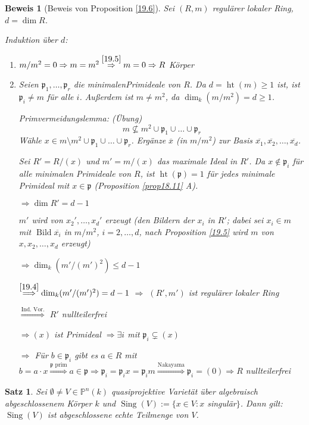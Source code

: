 \documentclass[a4paper, 12pt, numbers=noendperiod, chapterprefix=true]{scrbook}
\theoremstyle{break}
\newtheorem{Satz}{Satz}
\theoremstyle{nonumberbreak}
\newtheorem{Bew}{Beweis}
\theoremstyle{nonumberplain}
\DeclareMathOperator{\Sing}{Sing}
\DeclareMathOperator{\Bild}{Bild}
\DeclareMathOperator{\Ht}{ht}
\newcommand{\IP}{\mathbb{P}}%
\newcommand{\frakp}{\mathfrak{p}}
\begin{document}
\begin{Bew}[Beweis von Proposition \ref{19.6}]
Sei $(R,m)$ regul\"arer lokaler Ring, $d=\dim R$.

\emph{Induktion \"uber $d$:}\begin{enumerate}[\underline{$d=0$}:]
\item[\underline{$d=0$}:]
	$m/m^2=0\Rightarrow m=m^2 \overset{\ref{19.5}}{\Rightarrow} m=0 \Rightarrow R$ K\"orper
\item[\underline{$d\ge1$}:]
	Seien $\frakp_1,\ldots ,\frakp_r$ die minimalenPrimideale von $R$. Da $d=\Ht(m)\ge1$ ist, ist $\frakp_i\ne m$ f\"ur alle $i$. Au\ss erdem ist $m\ne m^2$, da $\dim_k(m/m^2)=d\ge1$.
	
	\emph{Primvermeidungslemma:} (\"Ubung)
		\[m\nsubseteq m^2 \cup \frakp_1\cup\ldots \cup \frakp_r\]
	W\"ahle $x\in m\setminus m^2 \cup \frakp_1 \cup \ldots \cup \frakp_r$. Erg\"anze $\overline{x}$ (in $m/m^2$) zur Basis $\overline{x_1}, \overline{x_2},\ldots ,\overline{x_d}$.
	
	Sei $R'=R/(x)$ und $m'=m/(x)$ das maximale Ideal in $R'$. Da $x\notin \frakp_i$ f\"ur alle minimalen Primideale von $R$, ist $\Ht(\frakp)=1$ f\"ur jedes minimale Primideal mit $x\in \frakp$ (Proposition \ref{prop18.11} A).
	
	$\Rightarrow \dim R' = d-1$
	
	$m'$ wird von $x_2',\ldots ,x_d'$ erzeugt (den Bildern der $x_i$ in $R'$; dabei sei $x_i\in m$ mit $\Bild \overline{x_i}$ in $m/m^2$, $i=2,\ldots ,d$, nach Proposition \ref{19.5} wird $m$ von $x,x_2,\ldots ,x_d$ erzeugt)
	
	$\Rightarrow \dim_k(m'/(m')^2)\le d-1$
	
	$\overset{\ref{19.4}}{\Longrightarrow} \dim_k(m'/(m')^2)=d-1$ $\Rightarrow$ $(R',m')$ ist regul\"arer lokaler Ring
	
	$\overset{\text{Ind. Vor.}}{\Longrightarrow}$ $R'$ nullteilerfrei
	
	$\Rightarrow (x)$ ist Primideal $\Rightarrow \exists i$ mit $\frakp_i\subsetneq(x)$
	
	$\Rightarrow $ F\"ur $b\in \frakp_i$ gibt es $a\in R$ mit $b=a\cdot x \overset{\frakp \text{ prim}}{\Longrightarrow} a\in \frakp \Rightarrow \frakp_i = \frakp_ix= \frakp_im \overset{\text{Nakayama}}{\Longrightarrow} \frakp_i=(0) \Rightarrow R$ nullteilerfrei
\end{enumerate}
\end{Bew}

\begin{Satz}
Sei $\emptyset\ne V\in \IP^n(k)$ quasiprojektive Variet\"at \"uber algebraisch abgeschlossenem K\"orper $k$ und $\Sing(V):=\{x\in V: x$ singul\"ar$\}$. Dann gilt: $\Sing(V)$ ist abgeschlossene echte Teilmenge von $V$.
\end{Satz}
\end{document}

